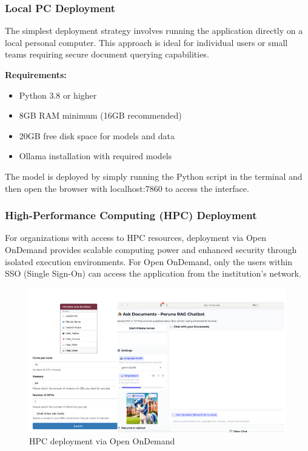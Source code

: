 \documentclass[12pt,letterpaper]{article}
\begin{document}
\subsubsection{Local PC Deployment}

The simplest deployment strategy involves running the application directly on a local personal computer. This approach is ideal for individual users or small teams requiring secure document querying capabilities.

\textbf{Requirements:}
\begin{itemize}
    \item Python 3.8 or higher
    \item 8GB RAM minimum (16GB recommended)
    \item 20GB free disk space for models and data
    \item Ollama installation with required models
\end{itemize}

The model is deployed by simply running the Python script in the terminal and then open the browser with localhost:7860 to access the interface.

\subsubsection{High-Performance Computing (HPC) Deployment}

For organizations with access to HPC resources, deployment via Open OnDemand provides scalable computing power and enhanced security through isolated execution environments.
For Open OnDemand, only the users within SSO (Single Sign-On) can access the application from the institution's network.

\begin{figure}[H]
    \centering
    \includegraphics[width=1.1\textwidth]{plots/HPC.png}
    \caption{HPC deployment via Open OnDemand}
    \label{fig:OOD}
\end{figure}
\end{document}
